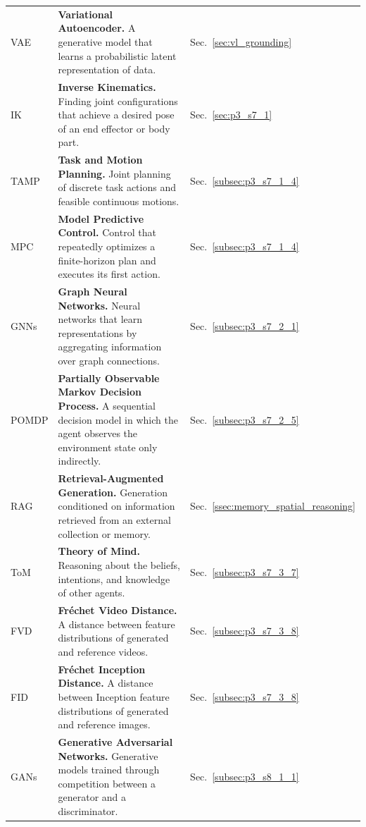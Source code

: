 \begin{longtable}{lll}
    VAE & \textbf{Variational Autoencoder.} A generative model that learns a probabilistic latent representation of data. & Sec.~\ref{sec:vl_grounding} \\
    
    IK & \textbf{Inverse Kinematics.} Finding joint configurations that achieve a desired pose of an end effector or body part. & Sec.~\ref{sec:p3_s7_1} \\
    
    TAMP & \textbf{Task and Motion Planning.} Joint planning of discrete task actions and feasible continuous motions. & Sec.~\ref{subsec:p3_s7_1_4} \\
    
    MPC & \textbf{Model Predictive Control.} Control that repeatedly optimizes a finite-horizon plan and executes its first action. & Sec.~\ref{subsec:p3_s7_1_4} \\
    
    GNNs & \textbf{Graph Neural Networks.} Neural networks that learn representations by aggregating information over graph connections. & Sec.~\ref{subsec:p3_s7_2_1} \\
    
    POMDP & \textbf{Partially Observable Markov Decision Process.} A sequential decision model in which the agent observes the environment state only indirectly. & Sec.~\ref{subsec:p3_s7_2_5} \\
    
    RAG & \textbf{Retrieval-Augmented Generation.} Generation conditioned on information retrieved from an external collection or memory. & Sec.~\ref{ssec:memory_spatial_reasoning} \\
    
    ToM & \textbf{Theory of Mind.} Reasoning about the beliefs, intentions, and knowledge of other agents. & Sec.~\ref{subsec:p3_s7_3_7} \\
    
    FVD & \textbf{Fr\'echet Video Distance.} A distance between feature distributions of generated and reference videos. & Sec.~\ref{subsec:p3_s7_3_8} \\
    
    FID & \textbf{Fr\'echet Inception Distance.} A distance between Inception feature distributions of generated and reference images. & Sec.~\ref{subsec:p3_s7_3_8} \\
    
    GANs & \textbf{Generative Adversarial Networks.} Generative models trained through competition between a generator and a discriminator. & Sec.~\ref{subsec:p3_s8_1_1} \\
    

\end{longtable}
